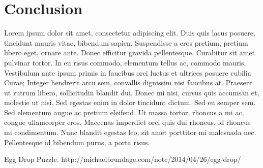 \documentclass[12pt,a4paper,oneside]{report}
\begin{document}
\chapter{Conclusion}
Lorem ipsum dolor sit amet, consectetur adipiscing elit. Duis quis lacus posuere, tincidunt mauris vitae, bibendum sapien. Suspendisse a eros pretium, pretium libero eget, ornare ante. Donec efficitur gravida pellentesque. Curabitur sit amet pulvinar tortor. In eu risus commodo, elementum tellus ac, commodo mauris. Vestibulum ante ipsum primis in faucibus orci luctus et ultrices posuere cubilia Curae; Integer hendrerit arcu sem, convallis dignissim nisi faucibus at. Praesent ut rutrum libero, sollicitudin blandit dui. Donec mi nisi, cursus quis accumsan et, molestie ut nisi. Sed egestas enim in dolor tincidunt dictum. Sed eu semper sem. Sed elementum augue ac pretium eleifend. Ut massa tortor, rhoncus a mi ac, congue ullamcorper eros. Maecenas imperdiet orci quis dui rhoncus, id rhoncus mi condimentum. Nunc blandit egestas leo, sit amet porttitor mi malesuada nec. Pellentesque id bibendum purus, a porta risus.


\renewcommand{\bibname}{References}
\begin{thebibliography}{1} 
	 Egg Drop Puzzle. http://michaelbrundage.com/note/2014/04/26/egg-drop/
\end{thebibliography}

\end{document}
